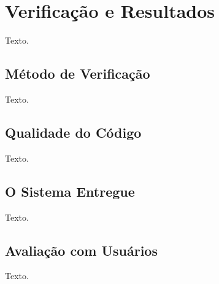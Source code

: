 \chapter{Verificação e Resultados}
\label{sec-verificacao}

Texto.


\section{Método de Verificação}
\label{sec-verificacao-metodo}

Texto.


\section{Qualidade do Código}
\label{sec-verificacao-qualidade}

Texto.


\section{O Sistema Entregue}
\label{sec-verificacao-sistema}

Texto.


\section{Avaliação com Usuários}
\label{sec-verificacao-avaliacao}

Texto.
